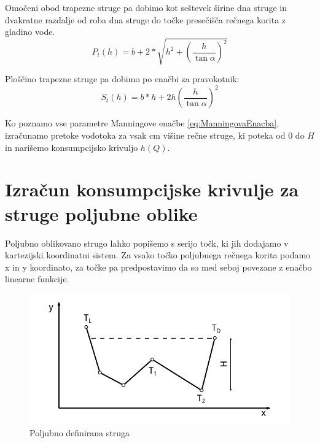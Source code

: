 \begin{enumerate}
	Omočeni obod trapezne struge pa dobimo kot seštevek širine dna struge in dvakratne razdalje od roba dna struge do točke presečišča rečnega korita z gladino vode.
	\begin{equation}
	P_{t}(h) = b + 2 * \sqrt{h^2 + \left(\dfrac{h} {\tan\alpha} \right)^{2}}
	\end{equation}
	
	Ploščino trapezne struge pa dobimo po enačbi za pravokotnik:
	\begin{equation}
	S_{t}(h) = b * h + 2 h \left( \dfrac{h}{ \tan\alpha} \right) ^ {2}
	\end{equation}
	
\end{enumerate}



Ko poznamo vse parametre Manningove enačbe \ref{eq:ManningovaEnacba}, izračunamo pretoke vodotoka za vsak cm višine rečne struge, ki poteka od 0 do $H$ in narišemo konsumpcijsko krivuljo $h(Q)$.


\newpage
\section{Izračun konsumpcijske krivulje za struge poljubne oblike}\label{customChannel_algortihm}


Poljubno oblikovano strugo lahko popišemo s serijo točk, ki jih dodajamo v kartezijski koordinatni sistem. Za vsako točko poljubnega rečnega korita podamo x in y koordinato, za točke pa predpostavimo da so med seboj povezane z enačbo linearne funkcije. 

\begin{figure}[ht!]
	\begin{centering}
		\includegraphics{slike/customChannel/customStruga.pdf}		
		\caption{Poljubno definirana struga}\label{fig:poljubnaStruga}
	\end{centering}
\end{figure}




